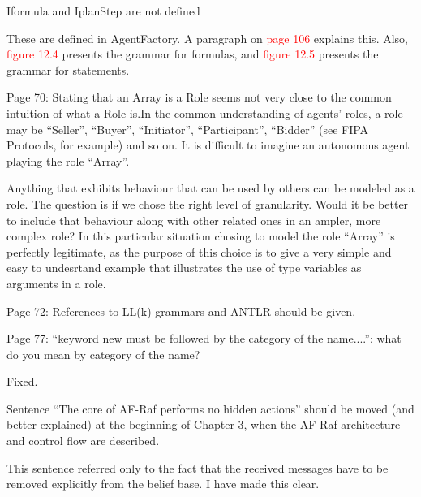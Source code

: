 \documentclass{article}
\newcommand*\R[1]{\textcolor{red}{#1}} %
\newcommand{\todo}[1]{[\textcolor{green}{TODO}: #1]}
\newenvironment{them}{\noindent\begingroup\color{blue}}{\endgroup\par}
\begin{document}
\begin{them}

Iformula and IplanStep are not defined

\end{them}
These are defined in AgentFactory. A paragraph on \R{page 106}  explains this.
Also, \R{figure 12.4} presents the grammar for formulas, and \R{figure 12.5}
presents the grammar for statements.

\begin{them}

Page 70:
Stating that an Array is a Role seems not very close to the common intuition of
what a Role is.In the common understanding of agents' roles, a role may be
“Seller”, “Buyer”, “Initiator”, “Participant”, “Bidder” (see FIPA Protocols,
for example) and so on. It is difficult to imagine an autonomous agent playing
the role “Array”.

\end{them}
Anything that exhibits behaviour that can be used by others can be modeled as a
role. The question is if we chose the right level of granularity. Would it be
better to include that behaviour along with other related ones in an ampler,
more complex role? In this particular situation chosing to model the role
``Array'' is perfectly legitimate, as the purpose of this choice is to give a
very simple and easy to undesrtand example that illustrates the use of type
variables as arguments in a role.

\begin{them}

Page 72:
References to LL(k) grammars and ANTLR should be given.
\end{them}
\todo{}

\begin{them}

Page 77:
“keyword new must be followed by the category of the name....”: what do you
mean by category of the name?

\end{them}
Fixed.

\begin{them}

Sentence “The core of AF-Raf performs no hidden actions” should be moved (and
better explained) at the beginning of Chapter 3, when the AF-Raf architecture
and control flow are described.

\end{them}
This sentence referred only to the fact that the received messages have to be
removed explicitly from the belief base. I have made this clear.
\end{document}
